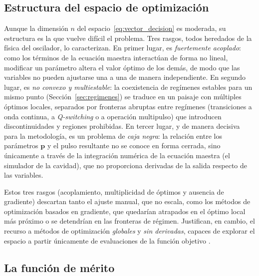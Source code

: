 \subsection{Estructura del espacio de optimización}
\label{sec:estructura_espacio}

Aunque la dimensión $n$ del espacio~\eqref{eq:vector_decision} es moderada, su
estructura es la que vuelve difícil el problema. Tres rasgos, todos heredados de la física del oscilador, lo caracterizan. En primer lugar, es
\emph{fuertemente acoplado}: como los términos de la ecuación maestra interactúan
de forma no lineal, modificar un parámetro altera el valor óptimo de los demás, de
modo que las variables no pueden ajustarse una a una de manera independiente. En
segundo lugar, es \emph{no convexo y multiestable}: la coexistencia de regímenes
estables para un mismo punto (Sección~\ref{sec:regimenes}) se traduce en un paisaje
con múltiples óptimos locales, separados por fronteras abruptas entre regímenes
(transiciones a onda continua, a \emph{Q-switching} o a operación multipulso) que
introducen discontinuidades y regiones prohibidas. En tercer lugar, y de manera
decisiva para la metodología, es un problema de \emph{caja negra}: la relación
entre los parámetros $\mathbf{p}$ y el pulso resultante no se conoce en forma
cerrada, sino únicamente a través de la integración numérica de la ecuación maestra
(el simulador de la cavidad), que no proporciona derivadas de la salida respecto de
las variables.

Estos tres rasgos (acoplamiento, multiplicidad de óptimos y ausencia de
gradiente) descartan tanto el ajuste manual, que no escala, como los métodos de
optimización basados en gradiente, que quedarían atrapados en el óptimo local más
próximo o se detendrían en las fronteras de régimen. Justifican, en cambio, el
recurso a métodos de optimización \emph{globales} y \emph{sin derivadas}, capaces
de explorar el espacio a partir únicamente de evaluaciones de la función objetivo
\cite{Genty2021,BruntonKutz2022}. 

\subsection{La función de mérito}
\label{sec:funcion_merito}

